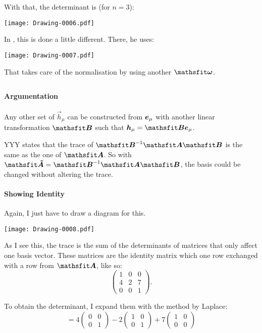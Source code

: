 With that, the determinant is (for $n = 3$):
\begin{center}
    \texttt{[image: Drawing-0006.pdf]}
\end{center}

In \parencite{penrose-road_to_reality}, this is done a little different. There,
he uses:
\begin{center}
    \texttt{[image: Drawing-0007.pdf]}
\end{center}

That takes care of the normalisation by using another $\tens \omega$.

\subsection{}

\paragraph{Argumentation}

Any other set of $\vec h_\mu$ can be constructed from $\boldsymbol{e}_\mu$ with another
linear transformation $\tens B$ such that $\vec h_\mu = \tens B \ev_\mu$.

YYY states that the trace of $\tens B^{-1} \tens A \tens B$ is the same as the
one of $\tens A$. So with $\tens{\tilde A} = \tens B^{-1} \tens A \tens B$, the
basis could be changed without altering the trace.

\paragraph{Showing Identity}

Again, I just have to draw a diagram for this.
\begin{center}
    \texttt{[image: Drawing-0008.pdf]}
\end{center}

As I see this, the trace is the sum of the determinants of matrices that only
affect one basis vector. These matrices are the identity matrix which one row
exchanged with a row from $\tens A$, like so:
\[
    \begin{pmatrix}
        1 & 0 & 0 \\
        4 & 2 & 7 \\
        0 & 0 & 1
    \end{pmatrix}.
\]

To obtain the determinant, I expand them with the method by Laplace:
\[
    = 4 \begin{pmatrix}
        0 & 0 \\ 0 & 1
    \end{pmatrix}
    - 2 \begin{pmatrix}
        1 & 0 \\ 0 & 1
    \end{pmatrix}
    + 7 \begin{pmatrix}
        1 & 0 \\ 0 & 0
    \end{pmatrix}
\]

